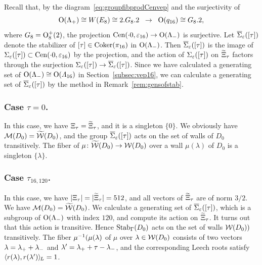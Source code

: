 \documentclass{amsart} %
\begin{document}
Recall that, 
by 
the diagram~\eqref{eq:groupfibprodCenvep} and the surjectivity of 
\[
\mathord{\mathrm{O}}(\Lambda_{+})\cong W(E_8)\cong 2.G_8 . 2\;\;\to\;\; \mathord{\mathrm{O}}(q_{16})\cong G_8. 2,
\]
where $G_8=\mathord{\mathrm{O}}^+_{8} (2)$,
the projection
$\mathrm{Cen}(\cdot 0, \varepsilon_{16})\to \mathord{\mathrm{O}}(\Lambda_{-})$ is surjective.
Let $\overline{\Sigma}_{\varepsilon} ([\tau])$ denote the stabilizer of $[\tau]\in \operatorname{Coker}(\pi_{16})$ in $ \mathord{\mathrm{O}}(\Lambda_{-})$.
Then $\overline{\Sigma}_{\varepsilon} ([\tau])$ is the image of $\Sigma_{\varepsilon} ([\tau])\subset \mathrm{Cen}(\cdot 0, \varepsilon_{16})$
by the projection, and 
the action of $\Sigma_{\varepsilon} ([\tau])$
on $\widetilde{\Xi}_{\tau}$ 
factors through the surjection $\Sigma_{\varepsilon} ([\tau])\to\overline{\Sigma}_{\varepsilon} ([\tau])$.
Since we have calculated a generating set of $ \mathord{\mathrm{O}}(\Lambda_{-})\cong \mathord{\mathrm{O}}(\varLambda_{16})$
 in Section~\ref{subsec:vep16},
we can calculate a generating set of $\overline{\Sigma}_{\varepsilon} ([\tau])$
by the method in Remark~\ref{rem:gensofstab}.
%
\subsubsection{Case $\tau=0$.}
%
In this case,
we have $\Xi_{\tau}=\widetilde{\Xi}_{\tau}$,
and it is a singleton $\{0\}$.
We obviously have $\mathord{\mathcal{M}}(D_0)=\widetilde{\mathord{\mathcal{W}}}(D_0)$,
and the group $\overline{\Sigma}_{\varepsilon} ([\tau])$ acts 
on the set of walls of $D_0$ transitively.
The fiber of $\mu\colon \widetilde{\mathord{\mathcal{W}}}(D_0)\to\mathord{\mathcal{W}}(D_0)$ 
over a wall $\mu(\lambda)$ of $D_0$ is a singleton $\{\lambda\}$.
%
%
\subsubsection{Case $\tau_{16, 120}$.}
%
In this case,
we have $|\Xi_{\tau}|=|\widetilde{\Xi}_{\tau}|=512$,
and all vectors of $\widetilde{\Xi}_{\tau}$ are of norm $3/2$.
We have $\mathord{\mathcal{M}}(D_0)=\widetilde{\mathord{\mathcal{W}}}(D_0)$.
We calculate a generating set of $\overline{\Sigma}_{\varepsilon} ([\tau])$,
which is a subgroup of $ \mathord{\mathrm{O}}(\Lambda_{-})$ with index $120$,
and compute its action on $\widetilde{\Xi}_{\tau}$.
It turns out that this action is transitive.
Hence $\operatorname{Stab}_{\Gamma}(D_0)$ acts on the set of walls $\mathord{\mathcal{W}}(D_0))$ transitively.
The fiber 
 $\mu^{-1}(\mu(\lambda)$ of $\mu$ over $\lambda\in \mathord{\mathcal{W}}(D_0)$ consists 
of two vectors
$\lambda={\lambda}_{+}+{\lambda}_{-}$ and $\lambda^{\prime}={\lambda}_{+}+\tau-{\lambda}_{-}$, and 
the corresponding Leech roots 
 satisfy
$\langle r(\lambda), r(\lambda^{\prime}) \rangle_{\hskip -1pt L}=1$.
%
\end{document}
